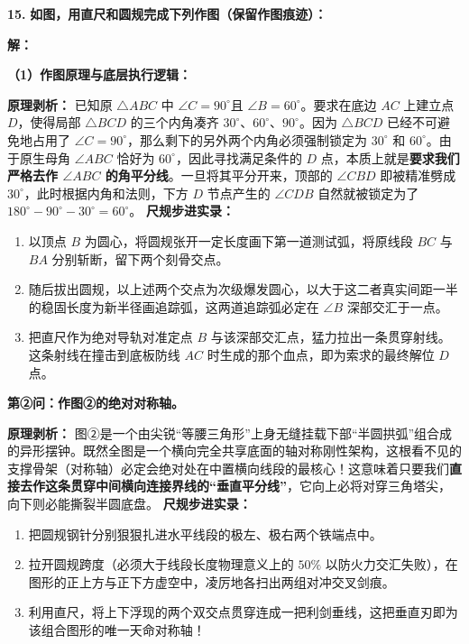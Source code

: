 \textbf{\LARGE 15.} \textbf{如图，用直尺和圆规完成下列作图（保留作图痕迹）：}

\vspace{0.4cm}

\textbf{解：}

\textbf{（1）作图原理与底层执行逻辑：}

\textbf{原理剥析：} 已知原 $\triangle ABC$ 中 $\angle C = 90^\circ$且 $\angle B = 60^\circ$。要求在底边 $AC$ 上建立点 $D$，使得局部 $\triangle BCD$ 的三个内角凑齐 $30^\circ$、$60^\circ$、$90^\circ$。因为 $\triangle BCD$ 已经不可避免地占用了 $\angle C = 90^\circ$，那么剩下的另外两个内角必须强制锁定为 $30^\circ$ 和 $60^\circ$。由于原生母角 $\angle ABC$ 恰好为 $60^\circ$，因此寻找满足条件的 $D$ 点，本质上就是\textbf{要求我们严格去作 $\angle ABC$ 的角平分线}。一旦将其平分开来，顶部的 $\angle CBD$ 即被精准劈成 $30^\circ$，此时根据内角和法则，下方 $D$ 节点产生的 $\angle CDB$ 自然就被锁定为了 $180^\circ - 90^\circ - 30^\circ = 60^\circ$。
\textbf{尺规步进实录：}
\begin{enumerate}
    \item 以顶点 $B$ 为圆心，将圆规张开一定长度画下第一道测试弧，将原线段 $BC$ 与 $BA$ 分别斩断，留下两个刻骨交点。
    \item 随后拔出圆规，以上述两个交点为次级爆发圆心，以大于这二者真实间距一半的稳固长度为新半径画追踪弧，这两道追踪弧必定在 $\angle B$ 深部交汇于一点。
    \item 把直尺作为绝对导轨对准定点 $B$ 与该深部交汇点，猛力拉出一条贯穿射线。这条射线在撞击到底板防线 $AC$ 时生成的那个血点，即为索求的最终解位 $D$ 点。
\end{enumerate}

\textbf{第②问：作图②的绝对对称轴。}

\textbf{原理剥析：} 图②是一个由尖锐“等腰三角形”上身无缝挂载下部“半圆拱弧”组合成的异形摆钟。既然全图是一个横向完全共享底面的轴对称刚性架构，这根看不见的支撑骨架（对称轴）必定会绝对处在中置横向线段的最核心！这意味着只要我们\textbf{直接去作这条贯穿中间横向连接界线的“垂直平分线”}，它向上必将对穿三角塔尖，向下则必能撕裂半圆底盘。
\textbf{尺规步进实录：}
\begin{enumerate}
    \item 把圆规钢针分别狠狠扎进水平线段的极左、极右两个铁端点中。
    \item 拉开圆规跨度（必须大于线段长度物理意义上的 $50\%$ 以防火力交汇失败），在图形的正上方与正下方虚空中，凌厉地各扫出两组对冲交叉剑痕。
    \item 利用直尺，将上下浮现的两个双交点贯穿连成一把利剑垂线，这把垂直刃即为该组合图形的唯一天命对称轴！
\end{enumerate}


